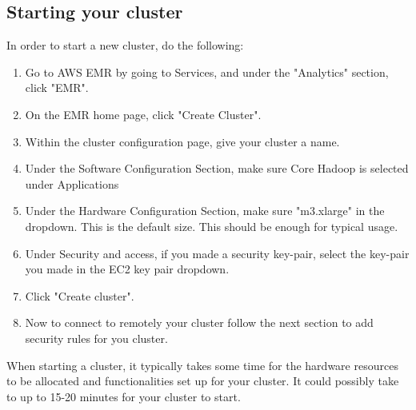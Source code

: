 \documentclass{article}
\begin{document}
\subsection{Starting your cluster}
In order to start a new cluster, do the following:
\begin{enumerate}
    \item Go to AWS EMR by going to Services,  and under the "Analytics" section, click "EMR".
    \item On the EMR home page, click "Create Cluster".
    \item Within the cluster configuration page, give your cluster a name.
    \item Under the Software Configuration Section, make sure Core Hadoop is selected under Applications
    \item Under the Hardware Configuration Section, make sure "m3.xlarge" in the dropdown. This is the default size. This should be enough for typical usage.
    \item Under Security and access, if you made a security key-pair, select the key-pair you made in the EC2 key pair dropdown.
    \item Click "Create cluster".
    \item Now to connect to remotely your cluster follow the next section to add security rules for you cluster. 
\end{enumerate}
\begin{info}
When starting a cluster, it typically takes some time for the hardware resources to be allocated and functionalities set up for your cluster. It could possibly take to up to 15-20 minutes for your cluster to start.
\end{info}
\end{document}

